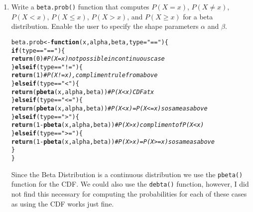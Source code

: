 \documentclass{article}\usepackage[]{graphicx}\usepackage[]{xcolor}
\makeatletter
\newcommand{\hlnum}[1]{\textcolor[rgb]{0.686,0.059,0.569}{#1}}%
\newcommand{\hlsng}[1]{\textcolor[rgb]{0.192,0.494,0.8}{#1}}%
\newcommand{\hlcom}[1]{\textcolor[rgb]{0.678,0.584,0.686}{\textit{#1}}}%
\newcommand{\hlopt}[1]{\textcolor[rgb]{0,0,0}{#1}}%
\newcommand{\hldef}[1]{\textcolor[rgb]{0.345,0.345,0.345}{#1}}%
\newcommand{\hlkwa}[1]{\textcolor[rgb]{0.161,0.373,0.58}{\textbf{#1}}}%
\newcommand{\hlkwb}[1]{\textcolor[rgb]{0.69,0.353,0.396}{#1}}%
\newcommand{\hlkwc}[1]{\textcolor[rgb]{0.333,0.667,0.333}{#1}}%
\newcommand{\hlkwd}[1]{\textcolor[rgb]{0.737,0.353,0.396}{\textbf{#1}}}%
\newenvironment{kframe}{%
 \def\at@end@of@kframe{}%
 \ifinner\ifhmode%
  \def\at@end@of@kframe{\end{minipage}}%
  \begin{minipage}{\columnwidth}%
 \fi\fi%
 \def\FrameCommand##1{\hskip\@totalleftmargin \hskip-\fboxsep
 \colorbox{shadecolor}{##1}\hskip-\fboxsep
     \hskip-\linewidth \hskip-\@totalleftmargin \hskip\columnwidth}%
 \MakeFramed {\advance\hsize-\width
   \@totalleftmargin\z@ \linewidth\hsize
   \@setminipage}}%
 {\par\unskip\endMakeFramed%
 \at@end@of@kframe}
\newenvironment{knitrout}{}{} %
\makeatother
\begin{document}
\begin{enumerate}
    \item Write a \texttt{beta.prob()} function that computes $P(X=x)$, 
    $P(X \neq x)$, $P(X<x)$, $P(X \leq x)$, $P(X > x)$, and $P(X \geq x)$
    for a beta distribution. Enable the user to specify the shape parameters
    $\alpha$ and $\beta$.
\begin{knitrout}\scriptsize
{}\color{fgcolor}\begin{kframe}
\begin{alltt}
\hldef{beta.prob} \hlkwb{<-} \hlkwa{function}\hldef{(}\hlkwc{x}\hldef{,} \hlkwc{alpha}\hldef{,} \hlkwc{beta}\hldef{,} \hlkwc{type}\hldef{=} \hlsng{"=="}\hldef{)\{}
  \hlkwa{if}\hldef{(type} \hlopt{==} \hlsng{"=="}\hldef{)\{}
    \hlkwd{return}\hldef{(}\hlnum{0}\hldef{)} \hlcom{#P(X=x) not possible in continuous case}
  \hldef{\}}\hlkwa{else if}\hldef{(type} \hlopt{==} \hlsng{"!="}\hldef{)\{}
    \hlkwd{return}\hldef{(}\hlnum{1}\hldef{)} \hlcom{#P(X!=x), compliment rule from above}
  \hldef{\}}\hlkwa{else if}\hldef{(type} \hlopt{==} \hlsng{"<"}\hldef{)\{}
    \hlkwd{return}\hldef{(}\hlkwd{pbeta}\hldef{(x, alpha, beta))} \hlcom{#P(X<x) CDF at x}
  \hldef{\}}\hlkwa{else if}\hldef{(type} \hlopt{==} \hlsng{"<="}\hldef{)\{}
    \hlkwd{return}\hldef{(}\hlkwd{pbeta}\hldef{(x, alpha, beta))} \hlcom{#P(X<x)=P(X<=x) so same as above}
  \hldef{\}}\hlkwa{else if}\hldef{(type} \hlopt{==} \hlsng{">"}\hldef{)\{}
    \hlkwd{return}\hldef{(}\hlnum{1}\hlopt{-}\hlkwd{pbeta}\hldef{(x, alpha, beta))} \hlcom{#P(X>x) compliment of P(X<x)}
  \hldef{\}}\hlkwa{else if}\hldef{(type} \hlopt{==} \hlsng{">="}\hldef{)\{}
    \hlkwd{return}\hldef{(}\hlnum{1}\hlopt{-}\hlkwd{pbeta}\hldef{(x, alpha, beta))} \hlcom{#P(X>x)=P(X>=x) so same as above}
  \hldef{\}}
\hldef{\}}
\end{alltt}
\end{kframe}
\end{knitrout}
Since the Beta Distribution is a continuous distribution we use the \verb|pbeta()| function for the CDF. We could also use the \verb|debta()| function, however, I did not find this necessary for computing the probabilities for each of these cases as using the CDF works just fine. 

\end{enumerate}

\end{document}
